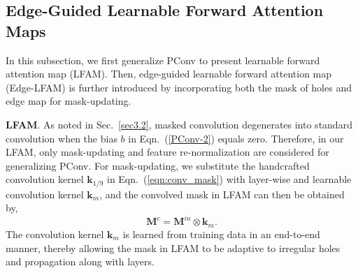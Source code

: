\documentclass[10pt,journal,compsoc]{IEEEtran}
\begin{document}
\subsection{Edge-Guided Learnable Forward Attention Maps}\label{sec3}
In this subsection, we first generalize PConv to present learnable forward attention map (LFAM).
%
Then, edge-guided learnable forward attention map (Edge-LFAM) is further introduced by incorporating both the mask of holes and edge map for mask-updating.


%



{\textbf{LFAM}.} As noted in Sec.~\ref{sec3.2}, masked convolution degenerates into standard convolution when the bias $b$ in Eqn.~(\ref{PConv-2}) equals zero.
%
Therefore, in our LFAM, only mask-updating and feature re-normalization are considered for generalizing PConv.
%
%
%
%
%
%
For mask-updating, we substitute the handcrafted convolution kernel $\mathbf{k}_{{1}/{9}}$ in Eqn.~(\ref{eqn:conv_mask}) with layer-wise and learnable convolution kernel $\mathbf{k}_{m}$, and the convolved mask in LFAM can then be obtained by,
%
\begin{equation}\label{eqn:conv_mask2}
	\mathbf{M}^c = \mathbf{M}^{in} \otimes \mathbf{k}_{m}.
\end{equation}
%
The convolution kernel $\mathbf{k}_{m}$ is learned from training data in an end-to-end manner, thereby allowing the mask in LFAM to be adaptive to irregular holes and propagation along with layers.
\end{document}
